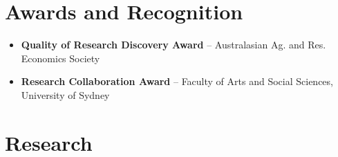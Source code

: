 \documentclass[10pt]{article}
\begin{document}
	\section*{Awards and Recognition}
	\begin{itemize}
	\item {} \textbf{Quality of Research Discovery Award} -- Australasian Ag. and Res. Economics Society
	\item {} \textbf{Research Collaboration Award} -- Faculty of Arts and Social Sciences, University of Sydney
	\end{itemize}
	
	\section*{Research}
	
	\begin{refsection}
		\nocite{conflict_seasia,elnino_conflict,ubilava2023ajae,ferguson2022,ubilava2022agec,hastings2022,angus2021,atalay2021,ubilava2019el,ubilava2019erl,ubilava2019md,ubilava2018ajae,smith2017gec,ubilava2017wd,tack2015agec,ubilava2014erae,tack2013cc,ubilava2013ems,ubilava2013ajare,ubilava2012agec,ubilava2012agri,ubilava2011jare,ubilava2011jcb,ubilava2010tfsc,ubilava2009fp}
		\printbibliography[heading={article}]
	\end{refsection}
	
\end{document}
